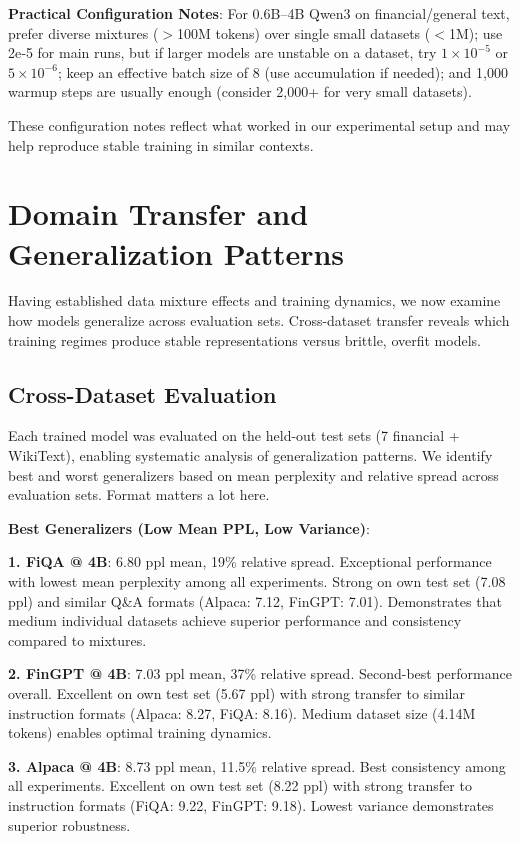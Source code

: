 \textbf{Practical Configuration Notes}: For 0.6B–4B Qwen3 on financial/general text, prefer diverse mixtures ($>$100M tokens) over single small datasets ($<$1M); use 2e‑5 for main runs, but if larger models are unstable on a dataset, try $1\times10^{-5}$ or $5\times10^{-6}$; keep an effective batch size of 8 (use accumulation if needed); and 1,000 warmup steps are usually enough (consider 2,000+ for very small datasets).

These configuration notes reflect what worked in our experimental setup and may help reproduce stable training in similar contexts.

\section{Domain Transfer and Generalization Patterns}

Having established data mixture effects and training dynamics, we now examine how models generalize across evaluation sets. Cross-dataset transfer reveals which training regimes produce stable representations versus brittle, overfit models.

\subsection{Cross-Dataset Evaluation}

Each trained model was evaluated on the held-out test sets (7 financial + WikiText), enabling systematic analysis of generalization patterns. We identify best and worst generalizers based on mean perplexity and relative spread across evaluation sets. Format matters a lot here.

\textbf{Best Generalizers (Low Mean PPL, Low Variance)}:

\textbf{1. FiQA @ 4B}: 6.80 ppl mean, 19\% relative spread. Exceptional performance with lowest mean perplexity among all experiments. Strong on own test set (7.08 ppl) and similar Q\&A formats (Alpaca: 7.12, FinGPT: 7.01). Demonstrates that medium individual datasets achieve superior performance and consistency compared to mixtures.

\textbf{2. FinGPT @ 4B}: 7.03 ppl mean, 37\% relative spread. Second-best performance overall. Excellent on own test set (5.67 ppl) with strong transfer to similar instruction formats (Alpaca: 8.27, FiQA: 8.16). Medium dataset size (4.14M tokens) enables optimal training dynamics.

\textbf{3. Alpaca @ 4B}: 8.73 ppl mean, 11.5\% relative spread. Best consistency among all experiments. Excellent on own test set (8.22 ppl) with strong transfer to instruction formats (FiQA: 9.22, FinGPT: 9.18). Lowest variance demonstrates superior robustness.

